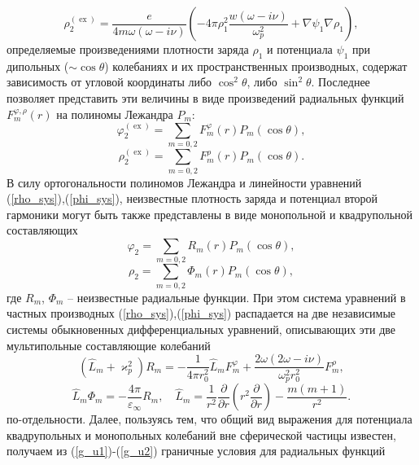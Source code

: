 \documentclass[12pt, a4paper]{article}
\def \eps {\varepsilon}
\def \w {\omega}
\def \ph {\varphi}
\def \kp { \varkappa}
\def \ex { \operatorname{ex}}
\begin{document}
\begin{equation} 	
	\rho^{(\ex)}_2 = \frac{e}{4 m \w(\w - i \nu)}\left(-4 \pi \rho_1^2 \frac{w(\w - i \nu)}{\w_p^2} + \nabla \psi_1\nabla \rho_1\right),
\end{equation}
определяемые произведениями плотности заряда $\rho_1$  и потенциала $\psi_1$ при дипольных ($\sim\cos\theta$) колебаниях и их пространственных производных, содержат зависимость от угловой координаты либо $\cos^2\theta$, либо  $\sin^2\theta$. Последнее позволяет представить эти величины в виде произведений радиальных функций $F_{m}^{\ph,\rho}(r)$ на полиномы Лежандра $P_m$:
\begin{equation}
	\label{P_phi_ex} 	
	\ph^{(\ex)}_2 =\sum_{m=0,2} F_m^\ph(r)P_m(\cos\theta),
\end{equation}
\begin{equation} 
	\label{P_rho_ex} 	
	\rho^{(\ex)}_2 =\sum_{m=0,2} F_m^\rho(r)P_m(\cos\theta).
\end{equation}
В силу ортогональности полиномов Лежандра и линейности уравнений (\ref{rho_sys}),(\ref{phi_sys}), неизвестные плотность заряда и потенциал второй гармоники могут быть также представлены в виде монопольной и квадрупольной составляющих 
\begin{equation} 	
	\ph_2 =\sum_{m=0,2} R_m(r)P_m(\cos\theta),
\end{equation}
\begin{equation} 	
	\rho_2 =\sum_{m=0,2} \Phi_m(r)P_m(\cos\theta),
\end{equation}
где $R_{m}$, $\Phi_{m}$ -- неизвестные радиальные функции. При этом система уравнений в частных производных  (\ref{rho_sys}),(\ref{phi_sys}) распадается на две независимые системы обыкновенных дифференциальных уравнений, описывающих эти две мультипольные составляющие колебаний
\begin{equation}
	\label{P_sys1}  	
	(\hat L_m + \kp_p^2) R_m = -\frac{1}{4 \pi r_0^2}\hat L_m F_m^\ph  + \frac{2\w(2\w - i \nu)}{\w_p^2r_0^2}F_m^\rho,
\end{equation}
\begin{equation} 
	\label{P_sys2} 	
	\hat L_m \Phi_m = -\frac{4\pi}{\eps_\infty}R_m,  \quad \hat{L}_m = \frac{1}{r^2} \frac{\partial}{\partial r} \left( r^2 \frac{\partial}{\partial r} \right) - \frac{m(m+1)}{r^2}.
\end{equation}
по-отдельности. Далее, пользуясь тем, что общий вид выражения для потенциала квадрупольных и монопольных колебаний вне сферической частицы известен, получаем из (\ref{g_u1})-(\ref{g_u2})  граничные условия для радиальных функций 
\end{document}
